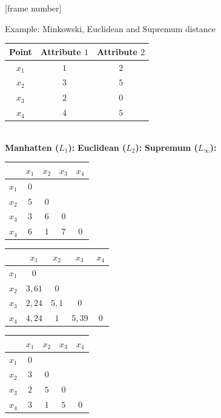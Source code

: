 \documentclass[aspectratio=169,t]{beamer}
\begin{document}
  {
    [frame number]
    \begin{frame}{Example: Minkowski, Euclidean and Supremum distance}
    \centering
        \begin{tabular}{| c | c | c |}
        \hline
        Point & Attribute $1$ & Attribute $2$\\\hline
        $x_1$ & $1$ & $2$\\\hline
        $x_2$ & $3$ & $5$\\\hline
        $x_3$ & $2$ & $0$\\\hline
        $x_4$ & $4$ & $5$\\\hline
        \end{tabular}\\[1cm]
      \textbf{Manhatten ($L_1$):} \hspace{2cm} \textbf{Euclidean ($L_2$):} \hspace{2cm} \textbf{Supremum ($L_\infty$):}\\
        \begin{tabular}{| c | c | c | c | c |}
        \hline
         & $x_1$ & $x_2$ & $x_3$ & $x_4$\\\hline
        $x_1$ & $0$ & & & \\\hline
        $x_2$ & $5$ & $0$ & & \\\hline
        $x_3$ & $3$ & $6$ & $0$ & \\\hline
        $x_4$ & $6$ & $1$ & $7$ & $0$ \\\hline
        \end{tabular}\hspace{0.1cm}
        \begin{tabular}{| c | c | c | c | c |}
        \hline
         & $x_1$ & $x_2$ & $x_3$ & $x_4$\\\hline
        $x_1$ & $0$ & & & \\\hline
        $x_2$ & $3,61$ & $0$ & & \\\hline
        $x_3$ & $2,24$ & $5,1$ & $0$ & \\\hline
        $x_4$ & $4,24$ & $1$ & $5,39$ & $0$ \\\hline
        \end{tabular}\hspace{0.1cm}
        \begin{tabular}{| c | c | c | c | c |}
        \hline
         & $x_1$ & $x_2$ & $x_3$ & $x_4$\\\hline
        $x_1$ & $0$ & & & \\\hline
        $x_2$ & $3$ & $0$ & & \\\hline
        $x_3$ & $2$ & $5$ & $0$ & \\\hline
        $x_4$ & $3$ & $1$ & $5$ & $0$ \\\hline
        \end{tabular}
    \end{frame}
  }
\end{document}
